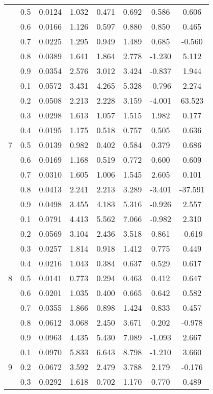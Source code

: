 \documentclass[11pt,a4paper]{report}
\begin{document}
\begin{longtable}{ | c | c || c | c | c | c | c | c | }
 & 0.5 & 0.0124 & 1.032 & 0.471 & 0.692 & 0.586 & 0.606 \\
 & 0.6 & 0.0166 & 1.126 & 0.597 & 0.880 & 0.850 & 0.465 \\
 & 0.7 & 0.0225 & 1.295 & 0.949 & 1.489 & 0.685 & -0.560 \\
 & 0.8 & 0.0389 & 1.641 & 1.864 & 2.778 & -1.230 & 5.112 \\
 & 0.9 & 0.0354 & 2.576 & 3.012 & 3.424 & -0.837 & 1.944 \\
 \hline
\multirow{9}{*}{7} & 0.1 & 0.0572 & 3.431 & 4.265 & 5.328 & -0.796 & 2.274 \\
 & 0.2 & 0.0508 & 2.213 & 2.228 & 3.159 & -4.001 & 63.523 \\
 & 0.3 & 0.0298 & 1.613 & 1.057 & 1.515 & 1.982 & 0.177 \\
 & 0.4 & 0.0195 & 1.175 & 0.518 & 0.757 & 0.505 & 0.636 \\
 & 0.5 & 0.0139 & 0.982 & 0.402 & 0.584 & 0.379 & 0.686 \\
 & 0.6 & 0.0169 & 1.168 & 0.519 & 0.772 & 0.600 & 0.609 \\
 & 0.7 & 0.0310 & 1.605 & 1.006 & 1.545 & 2.605 & 0.101 \\
 & 0.8 & 0.0413 & 2.241 & 2.213 & 3.289 & -3.401 & -37.591 \\
 & 0.9 & 0.0498 & 3.455 & 4.183 & 5.316 & -0.926 & 2.557 \\
 \hline
\multirow{9}{*}{8} & 0.1 & 0.0791 & 4.413 & 5.562 & 7.066 & -0.982 & 2.310 \\
 & 0.2 & 0.0569 & 3.104 & 2.436 & 3.518 & 0.861 & -0.619 \\
 & 0.3 & 0.0257 & 1.814 & 0.918 & 1.412 & 0.775 & 0.449 \\
 & 0.4 & 0.0216 & 1.043 & 0.384 & 0.637 & 0.529 & 0.617 \\
 & 0.5 & 0.0141 & 0.773 & 0.294 & 0.463 & 0.412 & 0.647 \\
 & 0.6 & 0.0201 & 1.035 & 0.400 & 0.665 & 0.642 & 0.582 \\
 & 0.7 & 0.0355 & 1.866 & 0.898 & 1.424 & 0.833 & 0.457 \\
 & 0.8 & 0.0612 & 3.068 & 2.450 & 3.671 & 0.202 & -0.978 \\
 & 0.9 & 0.0963 & 4.435 & 5.430 & 7.089 & -1.093 & 2.667 \\
 \hline
\multirow{9}{*}{9} & 0.1 & 0.0970 & 5.833 & 6.643 & 8.798 & -1.210 & 3.660 \\
 & 0.2 & 0.0672 & 3.592 & 2.479 & 3.788 & 2.179 & -0.176 \\
 & 0.3 & 0.0292 & 1.618 & 0.702 & 1.170 & 0.770 & 0.489 \\

\end{longtable}
\end{document}
